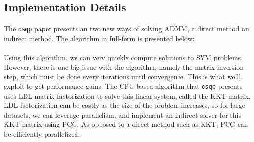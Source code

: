 \documentclass[justified,nobib]{tufte-handout}
\begin{document}
\begin{fullwidth}





 
\section{Implementation Details}
\paragraph{}
The \texttt{osqp} paper presents an two new ways of solving ADMM, a direct method an indirect method. The algorithm in full-form is presented below:
\begin{algorithm}[htp][
\SetKwInOut{Input}{input}\SetKwInOut{Output}{output} 
\SetAlgoLined
\textit{given:}
 $x^0, z^0, y^0 \; \textit{and parameters} \;\rho >0, \; \sigma >0, \; \alpha \in [0,2]$
 \\ \While{\textit{not terminated}}{
 ${(\tilde{x}^{k+1}, v^{k+1}) \leftarrow \begin{bmatrix}
P+\sigma I & A^T\\
A & -\rho^{-1}I  
\end{bmatrix}}
\begin{bmatrix}
\tilde{x}^{k+1}\\
v^{k+1}
\end{bmatrix}
= \begin{bmatrix}
\sigma x^k - q\\
z^k - \rho^{-1}y^k
\end{bmatrix}
$
\\
$\tilde{z}^{k+1} \leftarrow z^k + \rho^{-1}(v^{k+1} - y^k)$\\
$x^{k+1} \leftarrow \alpha\tilde{x}^{k+1} + (1-\alpha)x^k$ \\
$z^{k+1} \leftarrow \prod \left(\alpha\tilde{z}^{k+1}+(1-\alpha)z^k + \rho^{-1}y^k \right)$ \\
$y^{k+1} \leftarrow y^k + \rho(\alpha \tilde{z}^{k+1} + (1-\alpha)z^k - z^{k+1}$
 } \caption{ADMM algorithm as presented in \cite{osqp}}
\end{algorithm}
\paragraph{} Using this algorithm, we can very quickly compute solutions to SVM problems. However, there is one big issue with the algorithm, namely the matrix inversion step, which must be done every iterations until convergence. This is what we'll exploit to get performance gains. The CPU-based algorithm that \texttt{osqp} presents uses LDL matrix factorization to solve this linear system, called the KKT matrix. LDL factorization can be costly as the size of the problem increases, so for large datasets, we can leverage parallelism, and implement an indirect solver for this KKT matrix using PCG. As opposed to a direct method such as KKT, PCG can be efficiently parallelized. 


\end{fullwidth}
\end{document}
